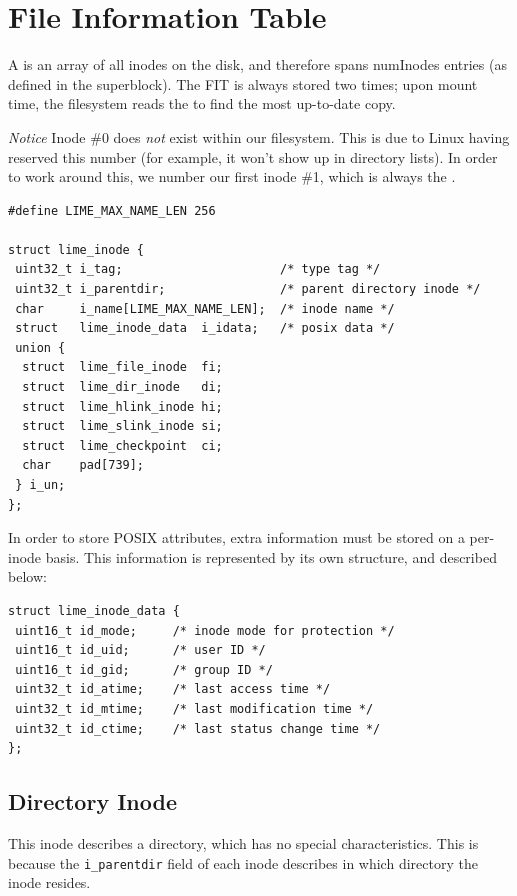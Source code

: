\section{File Information Table}
\label{fit}

A  is an array of all inodes on the disk, and therefore spans numInodes entries (as defined in the superblock). The FIT is always stored two times; upon mount time, the filesystem reads the  to find the most up-to-date copy.

\emph{Notice} Inode \#0 does \emph{not} exist within our filesystem. This is due to Linux having reserved this number (for example, it won't show up in directory lists). In order to work around this, we number our first inode \#1, which is always the .

\begin{verbatim}
#define LIME_MAX_NAME_LEN 256

struct lime_inode {
 uint32_t i_tag;                      /* type tag */
 uint32_t i_parentdir;                /* parent directory inode */
 char     i_name[LIME_MAX_NAME_LEN];  /* inode name */
 struct   lime_inode_data  i_idata;   /* posix data */
 union {
  struct  lime_file_inode  fi;
  struct  lime_dir_inode   di;
  struct  lime_hlink_inode hi;
  struct  lime_slink_inode si;
  struct  lime_checkpoint  ci;
  char    pad[739];
 } i_un;
};
\end{verbatim}

In order to store POSIX attributes, extra information must be stored on a per-inode basis. This information is represented by its own structure, and described below:

\begin{verbatim}
struct lime_inode_data {
 uint16_t id_mode;     /* inode mode for protection */ 
 uint16_t id_uid;      /* user ID */
 uint16_t id_gid;      /* group ID */
 uint32_t id_atime;    /* last access time */
 uint32_t id_mtime;    /* last modification time */
 uint32_t id_ctime;    /* last status change time */
};
\end{verbatim}

\subsection{Directory Inode}

This inode describes a directory, which has no special characteristics. This is because the \texttt{i\_parentdir} field of each inode describes in which directory the inode resides.

